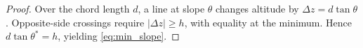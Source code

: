 \documentclass[10pt,a4paper]{amsart}
\begin{document}
\begin{proof}
Over the chord length $d$, a line at slope $\theta$ changes altitude by $\Delta z = d\tan\theta$. Opposite-side crossings require $|\Delta z|\ge h$, with equality at the minimum. Hence $d\tan\theta^* = h$, yielding \eqref{eq:min_slope}.
\end{proof}
\end{document}
